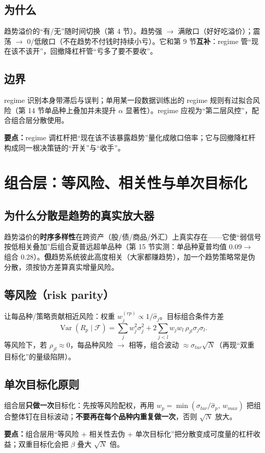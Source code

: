 \documentclass[UTF8,11pt]{ctexart}
\newcommand{\takeaway}[1]{\medskip\par\noindent\textbf{要点：}#1\par\medskip}
\begin{document}
\subsection{为什么}
趋势溢价的“有/无”随时间切换（第 4 节）。趋势强 $\to$ 满敞口（好好吃溢价）；震荡 $\to$ $0$/低敞口（不在趋势不付钱时持续小亏）。它和第 9 节\textbf{互补}：regime 管“现在该不该开”，回撤降杠杆管“亏多了要不要收”。
\subsection{边界}
regime 识别本身带滞后与误判；单用某一段数据训练出的 regime 规则有过拟合风险（第 14 节单品种上叠加并未提升 $\alpha$ 显著性）。regime 应视为“第二层风控”，配合组合层分散使用。

\takeaway{regime 调杠杆把“现在该不该暴露趋势”量化成敞口倍率；它与回撤降杠杆构成同一根决策链的“开关”与“收手”。}

\section{组合层：等风险、相关性与单次目标化}
\subsection{为什么分散是趋势的真实放大器}
趋势溢价的\textbf{时序多样性}在跨资产（股/债/商品/外汇）上真实存在——它使“弱信号按低相关叠加”后组合夏普远超单品种（第 15 节实测：单品种夏普均值 $0.09\to$ 组合 $0.28$）。\textbf{但}趋势系统彼此高度相关（大家都赚趋势），加一个趋势策略常是伪分散，须按协方差算真实增量风险。
\subsection{等风险（risk parity）}
让每品种/策略贡献相近风险：权重 $w_j^{(rp)}\propto 1/\hat\sigma_j$。目标组合条件方差
\begin{equation}
\operatorname{Var}(R_p\mid\mathcal{F})=\sum_j w_j^2\sigma_j^2+2\sum_{j<l}w_j w_l\,\rho_{jl}\sigma_j\sigma_l .
\end{equation}
等风险下，若 $\rho_{jl}\approx0$，每品种风险 $\to$ 相等，组合波动 $\approx\sigma_{tar}\sqrt{N}$（再现“双重目标化”的量级陷阱）。
\subsection{单次目标化原则}
组合层\textbf{只做一次}目标化：先按等风险配权，再用 $w_p=\min(\sigma_{tar}/\hat\sigma_p,\,w_{max})$ 把组合整体钉在目标波动；\textbf{不要再在每个品种内重复做一次}，否则 $\sqrt N$ 放大。
\takeaway{组合层用“等风险 + 相关性去伪 + 单次目标化”把分散变成可度量的杠杆收益；双重目标化会把 $\beta$ 叠大 $\sqrt N$ 倍。}
\end{document}

